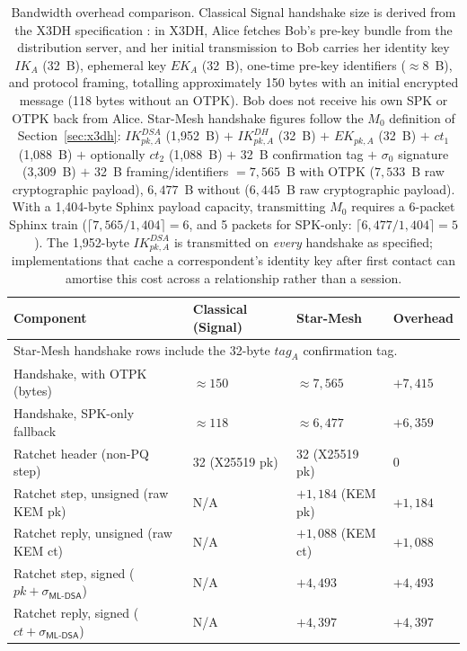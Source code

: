 \documentclass[11pt,a4paper]{article}
\theoremstyle{remark}
\theoremstyle{plain}
\newcommand{\MLDSA}{\mathsf{ML\text{-}DSA}}
\begin{document}
\begin{table}[ht]
\centering
\caption{Bandwidth overhead comparison.  Classical Signal handshake size is derived from the
X3DH specification \cite{marlinspike_x3dh}: in X3DH, Alice fetches Bob's pre-key bundle from the
distribution server, and her initial transmission to Bob carries her identity key $IK_A$ (32~B),
ephemeral key $EK_A$ (32~B), one-time pre-key identifiers ($\approx 8$~B), and protocol framing,
totalling approximately 150 bytes with an initial encrypted message (118 bytes without an OTPK).
Bob does not receive his own SPK or OTPK back from Alice.  Star-Mesh handshake figures follow the
$M_0$ definition of Section~\ref{sec:x3dh}: $IK^{DSA}_{pk,A}$ (1{,}952~B) $+$ $IK^{DH}_{pk,A}$ (32~B) $+$
$EK_{pk,A}$ (32~B) $+$ $ct_1$ (1{,}088~B) $+$ optionally $ct_2$ (1{,}088~B) $+$
32~B confirmation tag $+$ $\sigma_0$ signature (3{,}309~B) $+$ 32~B framing/identifiers $= 7{,}565$~B with OTPK ($7{,}533$~B raw
cryptographic payload), $6{,}477$~B without ($6{,}445$~B raw cryptographic payload).  With a 1{,}404-byte
Sphinx payload capacity, transmitting $M_0$ requires a 6-packet Sphinx train
($\lceil 7{,}565 / 1{,}404 \rceil = 6$, and 5 packets for SPK-only: $\lceil 6{,}477 / 1{,}404 \rceil = 5$).  The 1{,}952-byte $IK^{DSA}_{pk,A}$ is transmitted on
\emph{every} handshake as specified; implementations that cache a correspondent's identity
key after first contact can amortise this cost across a relationship rather than a session.}
\label{tab:overhead}
\small
\begin{tabular}{@{}llll@{}}
\toprule
\textbf{Component}               & \textbf{Classical (Signal)} & \textbf{Star-Mesh} & \textbf{Overhead} \\
\midrule
\multicolumn{4}{l}{\footnotesize Star-Mesh handshake rows include the 32-byte $tag_A$ confirmation tag.} \\
Handshake, with OTPK (bytes)     & $\approx 150$ \cite{marlinspike_x3dh} & $\approx 7{,}565$ & $+7{,}415$ \\
Handshake, SPK-only fallback     & $\approx 118$ \cite{marlinspike_x3dh} & $\approx 6{,}477$ & $+6{,}359$ \\
Ratchet header (non-PQ step)     & 32 (X25519 pk)              & 32 (X25519 pk)     & $0$ \\
Ratchet step, unsigned (raw KEM pk)   & N/A                   & $+1{,}184$ (KEM pk) & $+1{,}184$ \\
Ratchet reply, unsigned (raw KEM ct)  & N/A                   & $+1{,}088$ (KEM ct) & $+1{,}088$ \\
Ratchet step, signed ($pk+\sigma_{\MLDSA}$) & N/A             & $+4{,}493$          & $+4{,}493$ \\
Ratchet reply, signed ($ct+\sigma_{\MLDSA}$) & N/A            & $+4{,}397$          & $+4{,}397$ \\
\bottomrule
\end{tabular}
\end{table}
\end{document}
